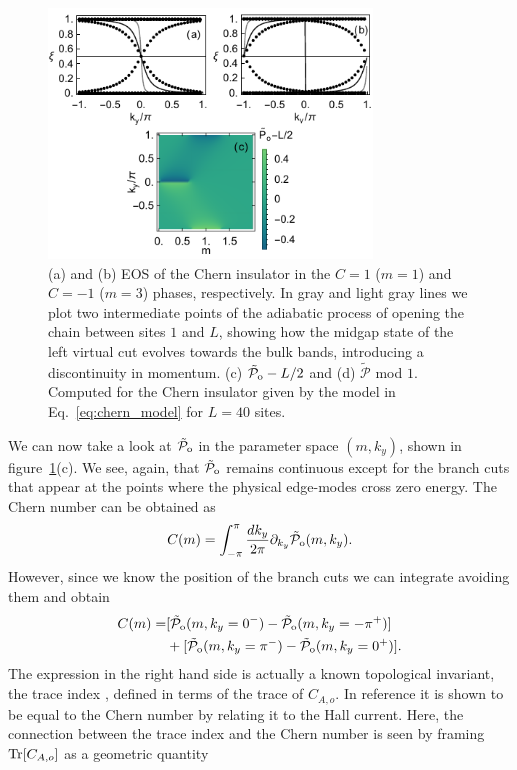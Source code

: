 \documentclass[twocolumn,amsmath,longbibliography,amssymb,superscriptaddress]{revtex4-1}
\newcommand{\tpo}{\tilde{\mathcal{P}}_{\rm o}}
\begin{document}
\begin{figure}[t]
\centering
\includegraphics[width=86mm]{fig7comp.pdf}
\caption{(a) and (b) EOS of the Chern insulator in the $C=1$ ($m=1$) and $C=-1$ ($m=3$) phases, respectively. In gray and light gray lines we plot two intermediate points of the adiabatic process of opening the chain between sites $1$ and $L$, showing how the midgap state of the left virtual cut evolves towards the bulk bands, introducing a discontinuity in momentum. (c) $\tpo-L/2$ and (d) $\tilde{\mathcal{P}}$ mod $1$. Computed for the Chern insulator given by the model in Eq.~\eqref{eq:chern_model} for $L=40$ sites. }
	\label{chern_insulator}
\end{figure}

We can now take a look at $\tpo$ in the parameter space $(m,k_y)$, shown in figure~\ref{chern_insulator}(c). We see, again, that $\tpo$ remains continuous except for the branch cuts that appear at the points where the physical edge-modes cross zero energy. The Chern number can be obtained as
\begin{equation}
C(m) = \int_{-\pi}^{\pi}\frac{dk_y}{2\pi} \partial_{k_y} \tpo(m,k_y).
\label{eq:Zaletel_chern}
\end{equation}
However, since we know the position of the branch cuts we can integrate avoiding them and obtain
\begin{align}
C(m) =& [\tpo(m,k_y=0^-)-\tpo(m,k_y=-\pi^+)]\\
&+[\tpo(m,k_y=\pi^-)-\tpo(m,k_y=0^+)].
\end{align}
The expression in the right hand side is actually a known topological invariant, the trace index \cite{Alexandrinata2011}, defined in terms of the trace of $C_{A,o}$. In reference \cite{Alexandrinata2011} it is shown to be equal to the Chern number by relating it to the Hall current. Here, the connection between the trace index and the Chern number is seen by framing $\Tr[C_{A,o}]$ as a geometric quantity 
\end{document}
